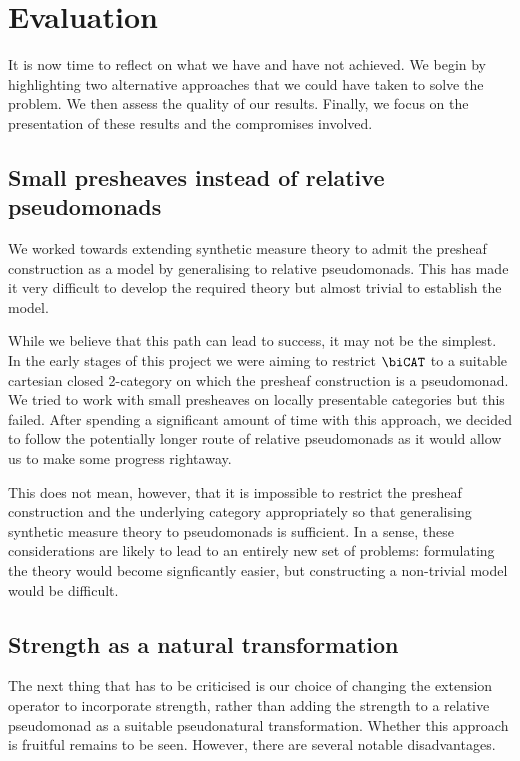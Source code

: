 \chapter{Evaluation}

It is now time to reflect on what we have and have not achieved. We begin
by highlighting two alternative approaches that we could have taken to solve
the problem. We then assess the quality of our results. Finally, we focus
on the presentation of these results and the compromises involved.

\section{Small presheaves instead of relative pseudomonads}\label{sec:small_presheaves}

We worked towards extending synthetic measure theory to admit the presheaf
construction as a model by generalising to relative pseudomonads. This has made
it very difficult to develop the required theory but almost trivial to establish
the model.

While we believe that this path can lead to success, it may not be the
simplest. In the early stages of this project we were aiming to restrict
$\biCAT$ to a suitable cartesian closed 2-category on which the presheaf
construction is a pseudomonad. We tried to work with small presheaves on
locally presentable categories but this failed. After spending a significant
amount of time with this approach, we decided to follow the potentially longer
route of relative pseudomonads as it would allow us to make some progress
rightaway.

This does not mean, however, that it is impossible to restrict the presheaf
construction and the underlying category appropriately so that generalising
synthetic measure theory to pseudomonads is sufficient. In a sense, these
considerations are likely to lead to an entirely new set of problems:
formulating the theory would become signficantly easier, but constructing a
non-trivial model would be difficult.

\section{Strength as a natural transformation}

The next thing that has to be criticised is our choice of changing the extension
operator to incorporate strength, rather than adding the strength to a relative
pseudomonad as a suitable pseudonatural transformation. Whether this approach is
fruitful remains to be seen. However, there are several notable disadvantages.

